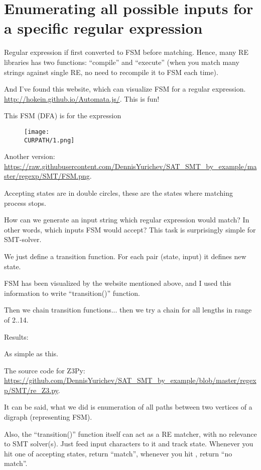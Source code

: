 \section{Enumerating all possible inputs for a specific regular expression}

\renewcommand{\CURPATH}{regexp/SMT}

Regular expression if first converted to \ac{FSM} before matching.
Hence, many \ac{RE} libraries has two functions: ``compile'' and ``execute''
(when you match many strings against single \ac{RE}, no need to recompile it to \ac{FSM} each time).

And I've found this website, which can visualize \ac{FSM} for a regular expression.
\url{http://hokein.github.io/Automata.js/}.
This is fun!

This \ac{FSM} (\ac{DFA}) is for the expression 

\begin{figure}[H]
\centering
\texttt{[image: \\CURPATH/1.png]}
\caption{}
\end{figure}

Another version: \url{https://raw.githubusercontent.com/DennisYurichev/SAT_SMT_by_example/master/regexp/SMT/FSM.png}.

Accepting states are in double circles, these are the states where matching process stops.

How can we generate an input string which regular expression would match?
In other words, which inputs \ac{FSM} would accept?
This task is surprisingly simple for SMT-solver.

We just define a transition function.
For each pair (state, input) it defines new state.

\ac{FSM} has been visualized by the website mentioned above, and I used this information to write ``transition()'' function.

Then we chain transition functions... then we try a chain for all lengths in range of 2..14.



Results:



As simple as this.

The source code for Z3Py: \url{https://github.com/DennisYurichev/SAT_SMT_by_example/blob/master/regexp/SMT/re_Z3.py}.

It can be said, what we did is enumeration of all paths between two vertices of a digraph (representing \ac{FSM}).

Also, the ``transition()'' function itself can act as a RE matcher, with no relevance to SMT solver(s).
Just feed input characters to it and track state.
Whenever you hit one of accepting states, return ``match'', whenever you hit , return ``no match''.

